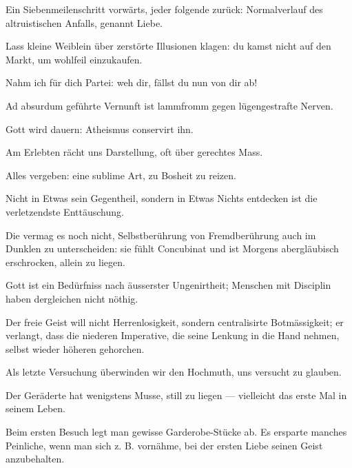 Ein Siebenmeilenschritt vorwärts, jeder folgende zurück: Normalverlauf des altruistischen Anfalls, genannt Liebe.
\par

Lass kleine Weiblein über zerstörte Illusionen klagen: du kamst nicht auf den Markt, um wohlfeil einzukaufen.
\par

Nahm ich für dich Partei: weh dir, fällst du nun von dir ab!
\par

Ad absurdum geführte Vernunft ist lammfromm gegen lügengestrafte Nerven.
\par

Gott wird dauern: Atheismus conservirt ihn.
\par

Am Erlebten rächt uns Darstellung, oft über gerechtes Mass.
\par

Alles vergeben: eine sublime Art, zu Bosheit zu reizen.
\par

Nicht in Etwas sein Gegentheil, sondern in Etwas Nichts entdecken ist die verletzendste Enttäuschung.
\par

Die  vermag es noch nicht, Selbstberührung von Fremdberührung auch im Dunklen zu unterscheiden: sie fühlt Concubinat und ist Morgens abergläubisch erschrocken, allein zu liegen.
\par

Gott ist ein Bedürfniss nach äusserster Ungenirtheit; Menschen mit Disciplin haben dergleichen nicht nöthig.
\par

Der freie Geist will nicht Herrenlosigkeit, sondern centralisirte Botmässigkeit; er verlangt, dass die niederen Imperative, die seine Lenkung in die Hand nehmen, selbst wieder höheren gehorchen.
\par

Als letzte Versuchung überwinden wir den Hochmuth, uns versucht zu glauben.
\par

Der Geräderte hat wenigstens Musse, still zu liegen — vielleicht das erste Mal in seinem Leben.
\par

Beim ersten Besuch legt man gewisse Garderobe-Stücke  ab. Es ersparte manches Peinliche, wenn man sich z. B. vornähme, bei der ersten Liebe seinen Geist anzubehalten.
\par

